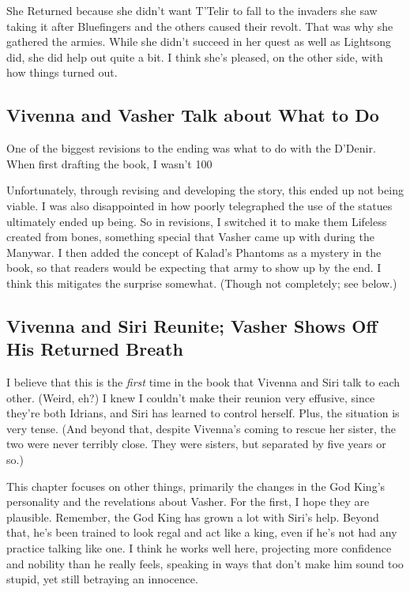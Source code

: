 She Returned because she didn’t want T’Telir to fall to the invaders she saw taking it after Bluefingers and the others caused their revolt. That was why she gathered the armies. While she didn’t succeed in her quest as well as Lightsong did, she did help out quite a bit. I think she’s pleased, on the other side, with how things turned out.

\subsection*{Vivenna and Vasher Talk about What to Do}

One of the biggest revisions to the ending was what to do with the D’Denir. When first drafting the book, I wasn’t 100%

Unfortunately, through revising and developing the story, this ended up not being viable. I was also disappointed in how poorly telegraphed the use of the statues ultimately ended up being. So in revisions, I switched it to make them Lifeless created from bones, something special that Vasher came up with during the Manywar. I then added the concept of Kalad’s Phantoms as a mystery in the book, so that readers would be expecting that army to show up by the end. I think this mitigates the surprise somewhat. (Though not completely; see below.)

\subsection*{Vivenna and Siri Reunite; Vasher Shows Off His Returned Breath}

I believe that this is the \textit{first} time in the book that Vivenna and Siri talk to each other. (Weird, eh?) I knew I couldn’t make their reunion very effusive, since they’re both Idrians, and Siri has learned to control herself. Plus, the situation is very tense. (And beyond that, despite Vivenna’s coming to rescue her sister, the two were never terribly close. They were sisters, but separated by five years or so.)

This chapter focuses on other things, primarily the changes in the God King’s personality and the revelations about Vasher. For the first, I hope they are plausible. Remember, the God King has grown a lot with Siri’s help. Beyond that, he’s been trained to look regal and act like a king, even if he’s not had any practice talking like one. I think he works well here, projecting more confidence and nobility than he really feels, speaking in ways that don’t make him sound too stupid, yet still betraying an innocence.

